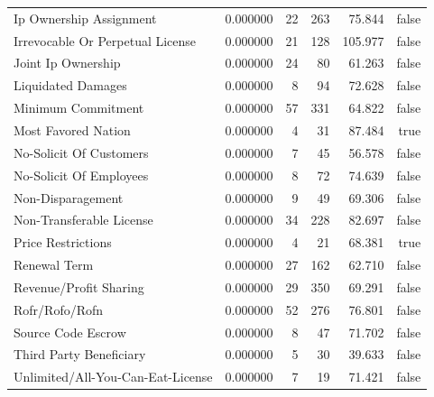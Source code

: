 \begin{tabular}{lrrrrr}
Ip Ownership Assignment & 0.000000 & 22 & 263 & 75.844 & false \\
Irrevocable Or Perpetual License & 0.000000 & 21 & 128 & 105.977 & false \\
Joint Ip Ownership & 0.000000 & 24 & 80 & 61.263 & false \\
Liquidated Damages & 0.000000 & 8 & 94 & 72.628 & false \\
Minimum Commitment & 0.000000 & 57 & 331 & 64.822 & false \\
Most Favored Nation & 0.000000 & 4 & 31 & 87.484 & true \\
No-Solicit Of Customers & 0.000000 & 7 & 45 & 56.578 & false \\
No-Solicit Of Employees & 0.000000 & 8 & 72 & 74.639 & false \\
Non-Disparagement & 0.000000 & 9 & 49 & 69.306 & false \\
Non-Transferable License & 0.000000 & 34 & 228 & 82.697 & false \\
Price Restrictions & 0.000000 & 4 & 21 & 68.381 & true \\
Renewal Term & 0.000000 & 27 & 162 & 62.710 & false \\
Revenue/Profit Sharing & 0.000000 & 29 & 350 & 69.291 & false \\
Rofr/Rofo/Rofn & 0.000000 & 52 & 276 & 76.801 & false \\
Source Code Escrow & 0.000000 & 8 & 47 & 71.702 & false \\
Third Party Beneficiary & 0.000000 & 5 & 30 & 39.633 & false \\
Unlimited/All-You-Can-Eat-License & 0.000000 & 7 & 19 & 71.421 & false \\
\bottomrule
\end{tabular}
